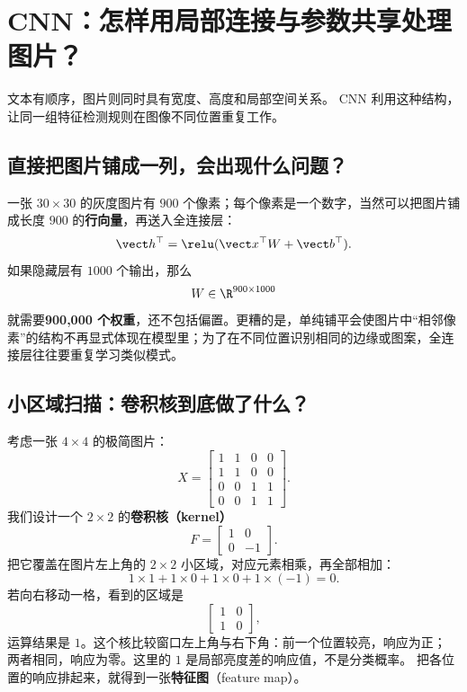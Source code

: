 \chapterrule
\section{CNN：怎样用局部连接与参数共享处理图片？}
\label{intro:19-cnn}

文本有顺序，图片则同时具有宽度、高度和局部空间关系。
CNN 利用这种结构，让同一组特征检测规则在图像不同位置重复工作。

\subsection{直接把图片铺成一列，会出现什么问题？}
\label{partq:vision}

一张 $30\times30$ 的灰度图片有 $900$ 个像素；每个像素是一个数字，当然可以把图片铺成长度 $900$ 的\textbf{行向量}，再送入全连接层：
\[
\vect h^\top=\relu(\vect x^\top W+\vect b^\top).
\]
如果隐藏层有 $1000$ 个输出，那么
\[
W\in\R^{900\times1000}
\]
就需要\textbf{900,000 个权重}，还不包括偏置。更糟的是，单纯铺平会使图片中“相邻像素”的结构不再显式体现在模型里；为了在不同位置识别相同的边缘或图案，全连接层往往要重复学习类似模式。

\subsection{小区域扫描：卷积核到底做了什么？}
\label{concept:kernel}
\label{concept:stride}
\label{concept:padding}
\label{concept:feature-map}

考虑一张 $4\times4$ 的极简图片：
\[
X=\begin{bmatrix}
1&1&0&0\\
1&1&0&0\\
0&0&1&1\\
0&0&1&1
\end{bmatrix}.
\]
我们设计一个 $2\times2$ 的\textbf{卷积核（kernel）}
\[
F=\begin{bmatrix}1&0\\0&-1\end{bmatrix}.
\]
把它覆盖在图片左上角的 $2\times2$ 小区域，对应元素相乘，再全部相加：
\[
1\times1+1\times0+1\times0+1\times(-1)=0.
\]
若向右移动一格，看到的区域是
\[
\begin{bmatrix}1&0\\1&0\end{bmatrix},
\]
运算结果是 $1$。这个核比较窗口左上角与右下角：前一个位置较亮，响应为正；
两者相同，响应为零。这里的 $1$ 是局部亮度差的响应值，不是分类概率。
把各位置的响应排起来，就得到一张\textbf{特征图}（feature map）。

